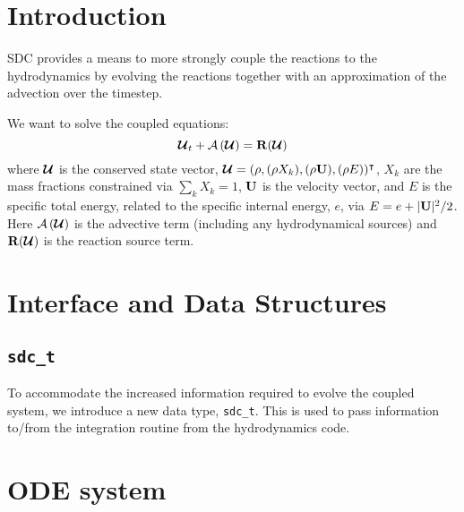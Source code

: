 \section{Introduction}

SDC provides a means to more strongly couple the reactions to the
hydrodynamics by evolving the reactions together with an approximation
of the advection over the timestep.

We want to solve the coupled equations:
\begin{equation}
{\bm{\mathcal{U}}}_t + {\mathcal{A} \left({\bm{\mathcal{U}}}\right)} = {\bf R}({\bm{\mathcal{U}}})
\end{equation}
where ${\bm{\mathcal{U}}}$ is the conserved state vector, ${\bm{\mathcal{U}}} = (\rho, (\rho X_k),
(\rho {\bf U}), (\rho E))^\intercal$, $X_k$ are the mass fractions
constrained via $\sum_k X_k = 1$, ${\bf U}$ is the velocity vector, and
$E$ is the specific total energy, related to the specific internal
energy, $e$, via $E = e + |{\bf U}|^2/2$.  Here ${\mathcal{A} \left({\bm{\mathcal{U}}}\right)}$ is the
advective term (including any hydrodynamical sources) and ${\bf R}({\bm{\mathcal{U}}})$
is the reaction source term.


\section{Interface and Data Structures}

\subsection{\tt sdc\_t}

To accommodate the increased information required to evolve the
coupled system, we introduce a new data type, {\tt sdc\_t}.  This is
used to pass information to/from the integration routine from the
hydrodynamics code.


\section{ODE system}

